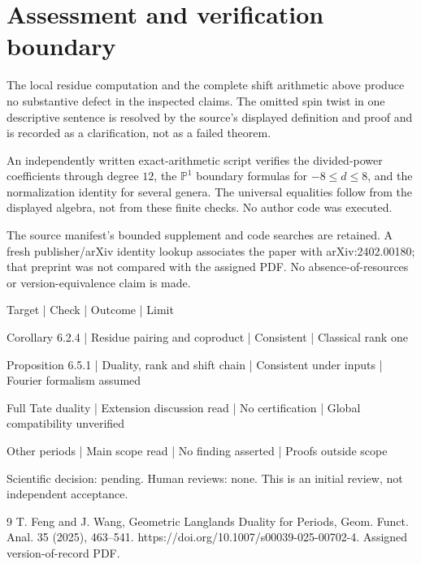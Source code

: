 \documentclass[10pt]{article}
\begin{document}
\section*{Assessment and verification boundary}
The local residue computation and the complete shift arithmetic above produce no substantive defect in the inspected claims. The omitted spin twist in one descriptive sentence is resolved by the source’s displayed definition and proof and is recorded as a clarification, not as a failed theorem.\par
An independently written exact-arithmetic script verifies the divided-power coefficients through degree \(12\), the \(\mathbb P^1\) boundary formulas for \(-8\leq d\leq8\), and the normalization identity for several genera. The universal equalities follow from the displayed algebra, not from these finite checks. No author code was executed.\par
The source manifest’s bounded supplement and code searches are retained. A fresh publisher/arXiv identity lookup associates the paper with arXiv:2402.00180; that preprint was not compared with the assigned PDF. No absence-of-resources or version-equivalence claim is made.\par
Target | Check | Outcome | Limit\par
Corollary 6.2.4 | Residue pairing and coproduct | Consistent | Classical rank one\par
Proposition 6.5.1 | Duality, rank and shift chain | Consistent under inputs | Fourier formalism assumed\par
Full Tate duality | Extension discussion read | No certification | Global compatibility unverified\par
Other periods | Main scope read | No finding asserted | Proofs outside scope\par
Scientific decision: pending. Human reviews: none. This is an initial review, not independent acceptance.\par
9 T. Feng and J. Wang, Geometric Langlands Duality for Periods, Geom. Funct. Anal. 35 (2025), 463–541. https://doi.org/10.1007/s00039-025-00702-4. Assigned version-of-record PDF.\par
\end{document}
